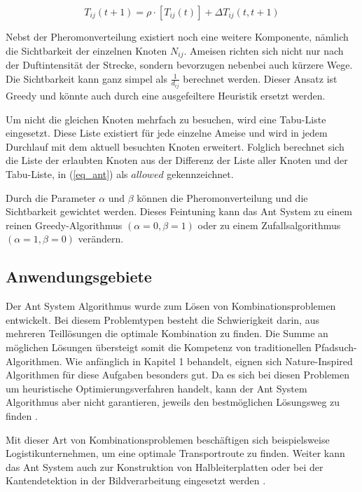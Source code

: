 \begin{equation}
    \label{eq_pheromon}
    T_{ij}(t + 1) = \rho \cdot [T_{ij}(t)] + \Delta T_{ij}(t, t+1)
\end{equation}
\label{eq_pheromon1}

Nebst der Pheromonverteilung existiert noch eine weitere Komponente, nämlich die Sichtbarkeit der einzelnen
Knoten $N_{ij}$. Ameisen richten sich nicht nur nach der Duftintensität der Strecke, sondern bevorzugen
nebenbei auch kürzere Wege. Die Sichtbarkeit kann ganz simpel als $\frac{1}{d_{ij}}$ berechnet werden. Dieser
Ansatz ist Greedy \cite{Wiki04} und könnte auch durch eine ausgefeiltere Heuristik ersetzt werden.

Um nicht die gleichen Knoten mehrfach zu besuchen, wird eine Tabu-Liste eingesetzt. Diese Liste existiert
für jede einzelne Ameise und wird in jedem Durchlauf mit dem aktuell besuchten Knoten erweitert. Folglich
berechnet sich die Liste der erlaubten Knoten aus der Differenz der Liste aller Knoten und der Tabu-Liste,
in (\ref{eq_ant}) als $allowed$ gekennzeichnet.

Durch die Parameter $\alpha \text{ und } \beta$ können die Pheromonverteilung und die Sichtbarkeit
gewichtet werden. Dieses Feintuning kann das Ant System zu einem reinen Greedy-Algorithmus
$(\alpha = 0, \beta = 1)$ oder zu einem Zufallsalgorithmus $(\alpha = 1, \beta = 0)$ verändern.


\subsection{Anwendungsgebiete}
Der Ant System Algorithmus wurde zum Lösen von Kombinationsproblemen entwickelt. Bei diesem Problemtypen
besteht die Schwierigkeit darin, aus mehreren Teillösungen die optimale Kombination zu finden. Die Summe
an möglichen Lösungen übersteigt somit die Kompetenz von traditionellen Pfadsuch-Algorithmen. Wie anfänglich
in Kapitel 1 behandelt, eignen sich Nature-Inspired Algorithmen für diese Aufgaben besonders gut. Da es
sich bei diesen Problemen um heuristische Optimierungsverfahren handelt, kann der Ant System Algorithmus
aber nicht garantieren, jeweils den bestmöglichen Lösungsweg zu finden \cite{Wiki03}.

Mit dieser Art von Kombinationsproblemen beschäftigen sich beispielsweise Logistikunternehmen, um eine
optimale Transportroute zu finden. Weiter kann das Ant System auch zur Konstruktion von Halbleiterplatten
oder bei der Kantendetektion in der Bildverarbeitung eingesetzt werden \cite{Wiki07}.

